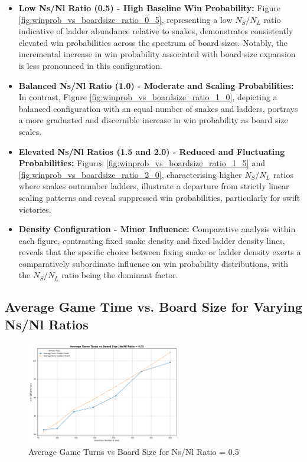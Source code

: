 \begin{itemize}
	\item \textbf{Low Ns/Nl Ratio (0.5) - High Baseline Win Probability:} Figure \ref{fig:winprob_vs_boardsize_ratio_0_5}, representing a low $N_S/N_L$ ratio indicative of ladder abundance relative to snakes, demonstrates consistently elevated win probabilities across the spectrum of board sizes. Notably, the incremental increase in win probability associated with board size expansion is less pronounced in this configuration. 
	\item \textbf{Balanced Ns/Nl Ratio (1.0) - Moderate and Scaling Probabilities:} In contrast, Figure \ref{fig:winprob_vs_boardsize_ratio_1_0}, depicting a balanced configuration with an equal number of snakes and ladders, portrays a more graduated and discernible increase in win probability as board size scales. 
	\item \textbf{Elevated Ns/Nl Ratios (1.5 and 2.0) - Reduced and Fluctuating Probabilities:} Figures \ref{fig:winprob_vs_boardsize_ratio_1_5} and \ref{fig:winprob_vs_boardsize_ratio_2_0}, characterising higher $N_S/N_L$ ratios where snakes outnumber ladders, illustrate a departure from strictly linear scaling patterns and reveal suppressed win probabilities, particularly for swift victories.
	\item \textbf{Density Configuration - Minor Influence:} Comparative analysis within each figure, contrasting fixed snake density and fixed ladder density lines, reveals that the specific choice between fixing snake or ladder density exerts a comparatively subordinate influence on win probability distributions, with the $N_S/N_L$ ratio being the dominant factor.
\end{itemize}


\subsection{Average Game Time vs. Board Size for Varying Ns/Nl Ratios}

\begin{figure}[th]
	\centering
	\includegraphics[width=0.6\textwidth]{"../Chapter 4/Latest/plots_output/AvgTurnsVsBoardSize_ByRatio/AvgTurnsVsBoardSize_ByRatio_ns_nl_ratio-0_5"}
	\caption{Average Game Turns vs Board Size for Ns/Nl Ratio = 0.5}
	\label{fig:avgturns_vs_boardsize_ratio_0_5_avg_turns}
\end{figure}

